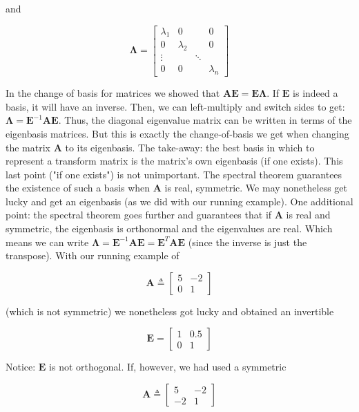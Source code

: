 \documentclass[main.tex]{subfiles}
\begin{document}
    and 
    
    $$
    \boldsymbol{\Lambda}=\left[\begin{array}{cccc}
    \lambda_{1} & 0 & & 0 \\
    0 & \lambda_{2} & & 0 \\
    \vdots & & \ddots & \\
    0 & 0 & & \lambda_{n}
    \end{array}\right]
    $$
    
    In the change of basis for matrices we showed that $\mathbf{A E}=\mathbf{E} \boldsymbol{\Lambda}$. If $\mathbf{E}$ is indeed a basis, it will have an inverse. Then, we can left-multiply and switch sides to get: $\boldsymbol{\Lambda}=\mathbf{E}^{-1} \mathbf{A} \mathbf{E}$. Thus, the diagonal eigenvalue matrix can be written in terms of the eigenbasis matrices. But this is exactly the change-of-basis we get when changing the matrix $\mathbf{A}$ to its eigenbasis. The take-away: the best basis in which to represent a transform matrix is the matrix's own eigenbasis (if one exists). This last point ("if one exists") is not unimportant. The spectral theorem guarantees the existence of such a basis when $\mathbf{A}$ is real, symmetric. We may nonetheless get lucky and get an eigenbasis (as we did with our running example). One additional point: the spectral theorem goes further and guarantees that if $\mathbf{A}$ is real and symmetric, the eigenbasis is orthonormal and the eigenvalues are real. Which means we can write $\boldsymbol{\Lambda}=\mathbf{E}^{-1} \mathbf{A} \mathbf{E}=\mathbf{E}^{T} \mathbf{A} \mathbf{E}$ (since the inverse is just the transpose). With our running example of
    
    $$
    \mathbf{A} \triangleq\left[\begin{array}{cc}
    5 & -2 \\
    0 & 1
    \end{array}\right]
    $$

    (which is not symmetric) we nonetheless got lucky and obtained an invertible
    
    $$
    \mathbf{E}=\left[\begin{array}{cc}
    1 & 0.5 \\
    0 & 1
    \end{array}\right]
    $$
    
    Notice: $\mathbf{E}$ is not orthogonal. If, however, we had used a symmetric
    
    $$
    \mathbf{A} \triangleq\left[\begin{array}{cc}
    5 & -2 \\
    -2 & 1
    \end{array}\right]
    $$
\end{document}
